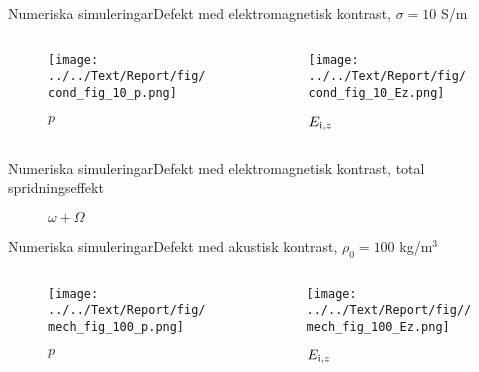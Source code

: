 \documentclass[11pt, final]{beamer}
\begin{document}
	\begin{frame}{Numeriska simuleringar}{Defekt med elektromagnetisk kontrast, $\sigma = 10$ S/m}
		\begin{columns}
			\begin{column}{0.5\textwidth}
				\begin{figure}
					\centering
					\texttt{[image: ../../Text/Report/fig/cond\_fig\_10\_p.png]}
					\caption*{$p$}
				\end{figure}
			\end{column}
			\begin{column}{0.5\textwidth}
				\begin{figure}
					\centering
					\texttt{[image: ../../Text/Report/fig/cond\_fig\_10\_Ez.png]}
					\caption*{$E_{\mathrm{i}, z}$}
				\end{figure}
			\end{column}
		\end{columns}
	\end{frame}
	
	\begin{frame}{Numeriska simuleringar}{Defekt med elektromagnetisk kontrast, total spridningseffekt}
		\begin{figure}
			\centering
			\resizebox{!}{0.8\textheight}{}
			\caption*{$\omega + \Omega$}
		\end{figure}
	\end{frame}
	
	\begin{frame}{Numeriska simuleringar}{Defekt med akustisk kontrast, $\rho_0 = 100$ kg/m$^3$}
		\begin{columns}
			\begin{column}{0.5\textwidth}
				\begin{figure}
					\centering
					\texttt{[image: ../../Text/Report/fig/mech\_fig\_100\_p.png]}
					\caption*{$p$}
				\end{figure}
			\end{column}
			\begin{column}{0.5\textwidth}
				\begin{figure}
					\centering
					\texttt{[image: ../../Text/Report/fig//mech\_fig\_100\_Ez.png]}
					\caption*{$E_{\mathrm{i}, z}$}
				\end{figure}
			\end{column}
		\end{columns}
	\end{frame}
	
\end{document}
